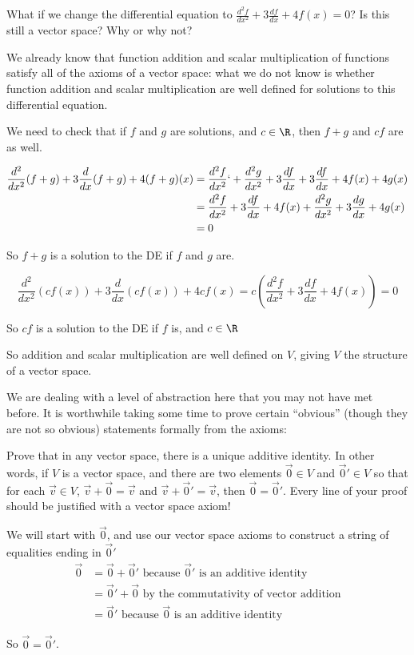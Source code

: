 \documentclass{ximera}
\begin{document}
What if we change the differential equation to $\frac{d^2f}{dx^2} + 3\frac{df}{dx} +4f(x) = 0$?  Is this still a vector space?  Why or why not?
\begin{free-response}
  We already know that function addition and scalar multiplication of functions satisfy all of the axioms of a vector space:  what we do not know is whether
  function addition and scalar multiplication are well defined for solutions to this differential equation.  
			
  We need to check that if $f$ and $g$ are solutions, and $c\in \R$, then $f+g$ and $cf$ are as well.
			
  \begin{align*}
    \frac{d^2}{dx^2}(f+g) + 3\frac{d}{dx}(f+g)+4(f+g)(x) &=  \frac{d^2f}{dx^2} `+ \frac{d^2g}{dx^2} + 3\frac{df}{dx} + 3\frac{df}{dx} +4f(x)+4g(x)\\
    &= \frac{d^2f}{dx^2} + 3\frac{df}{dx} +4f(x) + \frac{d^2g}{dx^2} + 3\frac{dg}{dx} +4g(x) \\
    &= 0
  \end{align*}
  
  So $f+g$ is a solution to the DE if $f$ and $g$ are.
  
  \[ \frac{d^2}{dx^2} (cf(x))+ 3\frac{d}{dx} (cf(x)) +4cf(x) = c(\frac{d^2f}{dx^2} + 3\frac{df}{dx} +4f(x)) = 0\]
  
  So $cf$ is a solution to the DE if $f$ is, and $c\in \R$
  
  So  addition and scalar multiplication are well defined on $V$, giving $V$ the structure of a vector space.
\end{free-response}

We are dealing with a level of abstraction here that you may not have
met before.  It is worthwhile taking some time to prove certain
``obvious'' (though they are not so obvious) statements
formally from the axioms:
	
Prove that in any vector space, there is a unique additive identity.  In other words, if $V$ is a vector space, and there are two elements $\vec{0} \in V$ and $\vec{0}' \in V$ so that for each 
$\vec{v} \in V$, $\vec{v}+\vec{0}=\vec{v}$ and $\vec{v} + \vec{0}' = \vec{v}$, then $\vec{0}=\vec{0}'$.  Every line of your proof should be justified with a vector space axiom!
		
\begin{free-response}
  We will start with $\vec{0}$, and use our vector space axioms to construct a string of equalities ending in $\vec{0}'$
  \begin{align*}
    \vec{0} &= \vec{0}+\vec{0}' \text{ because $\vec{0}'$ is an additive identity}\\
    &= \vec{0}'+\vec{0} \text{ by the commutativity of vector addition}\\
    &=\vec{0}'\text{ because $\vec{0}$ is an additive identity}
  \end{align*}
  
  So $\vec{0} = \vec{0}'$.
\end{free-response}	
		
\end{document}

